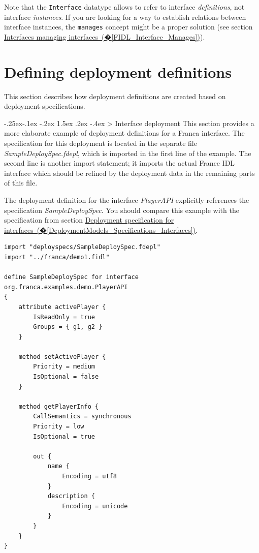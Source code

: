 \documentclass[a4paper,10pt]{scrreprt}
\makeatletter
\renewcommand\subsection{\medskip\@startsection{subsection}{2}{\z@}%
  {-.25ex\@plus -.1ex \@minus -.2ex}%
  {1.5ex \@plus .2ex \@minus -.4ex}%
  {\ifnum \scr@compatibility>\@nameuse{scr@v@2.96}\relax
    \setlength{\parfillskip}{\z@ plus 1fil}\fi
    \raggedsection\normalfont\sectfont\nobreak\size@subsection
  }%
}
\makeatother
\begin{document}
Note that the \protect\lstinline[language=FDeploy]{Interface} datatype allows to refer to interface
\textit{definitions}, not interface \textit{instances}. If you are looking for a way to
establish relations between interface instances, the \protect\lstinline[language=Franca]{manages} concept
might be a proper solution (see section
\hyperref[FIDL_Interface_Manages]{Interfaces managing interfaces~(�\ref*{FIDL_Interface_Manages})}).

\section{Defining deployment definitions}
\label{DeploymentModels_Definitions}
This section describes how deployment definitions are created based on 
deployment specifications.

\subsection{Interface deployment}
\label{DeploymentModels_Definitions_Interfaces}
This section provides a more elaborate example of deployment definitions for
a Franca interface. The specification for this deployment is located in the
separate file \textit{SampleDeploySpec.fdepl}, which is imported in the first line
of the example. The second line is another import statement; it imports the
actual France IDL interface which should be refined by the deployment data 
in the remaining parts of this file.

The deployment definition for the interface \textit{PlayerAPI} explicitly references
the specification \textit{SampleDeploySpec}. You should compare this example with 
the specification from section
\hyperref[DeploymentModels_Specifications_Interfaces]{Deployment specification for interfaces~(�\ref*{DeploymentModels_Specifications_Interfaces})}.


\begin{lstlisting}[language=FDeploy]
import "deployspecs/SampleDeploySpec.fdepl"
import "../franca/demo1.fidl"

define SampleDeploySpec for interface org.franca.examples.demo.PlayerAPI
{
	attribute activePlayer {
		IsReadOnly = true
		Groups = { g1, g2 }
	}
	
	method setActivePlayer {
		Priority = medium
		IsOptional = false
	}

	method getPlayerInfo {
		CallSemantics = synchronous
		Priority = low
		IsOptional = true
		
		out {
			name {
				Encoding = utf8
			}
			description {
				Encoding = unicode
			}
		}
	}
}
\end{lstlisting}
\end{document}
